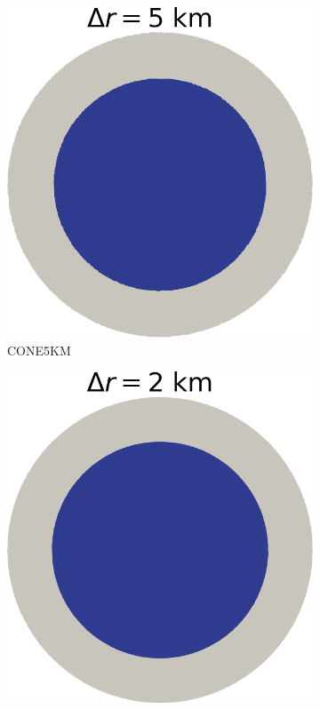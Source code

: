 \documentclass{article}
\begin{document}
\begin{figure}[!h]
	\medskip
	\begin{subfigure}{0.25\textwidth}
		\includegraphics[width=\linewidth]{../fig/Grounded_zone_5km_CONE.png}
		\caption{CONE5KM}
		\label{figCONE5}
	\end{subfigure}\hfil %
	\begin{subfigure}{0.25\textwidth}
		\includegraphics[width=\linewidth]{../fig/Grounded_zone_2km_CONE.png}

\end{subfigure}
\end{figure}
\end{document}
